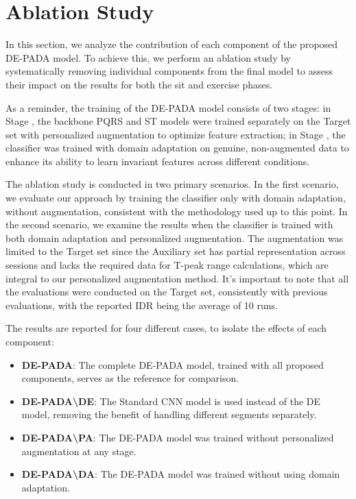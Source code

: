 \section{Ablation Study}
\label{sec:ablation_study}
In this section, we analyze the contribution of each component of the proposed DE-PADA model.
To achieve this, we perform an ablation study by systematically removing individual components from the final model to assess their impact on the results for both the sit and exercise phases.

As a reminder, the training of the DE-PADA model consists of two stages: in Stage \uppercase\expandafter{}, the backbone PQRS and ST models were trained separately on the Target set with personalized augmentation to optimize feature extraction; in Stage \uppercase\expandafter{}, the classifier was trained with domain adaptation on genuine, non-augmented data to enhance its ability to learn invariant features across different conditions.

The ablation study is conducted in two primary scenarios. In the first scenario, we evaluate our approach by training the classifier only with domain adaptation, without augmentation, consistent with the methodology used up to this point.
In the second scenario, we examine the results when the classifier is trained with both domain adaptation and personalized augmentation. The augmentation was limited to the Target set since the Auxiliary set has partial representation across sessions and lacks the required data for T-peak range calculations, which are integral to our personalized augmentation method. It's important to note that all the evaluations were conducted on the Target set, consistently with previous evaluations, with the reported IDR being the average of 10 runs.

The results are reported for four different cases, to isolate the effects of each component:
\begin{itemize}
    \item \textbf{DE-PADA}: The complete DE-PADA model, trained with all proposed components, serves as the reference for comparison.
    \item \textbf{DE-PADA\textbackslash DE}: The Standard CNN model is used instead of the DE model, removing the benefit of handling different segments separately.
    \item \textbf{DE-PADA\textbackslash PA}: The DE-PADA model was trained without personalized augmentation at any stage.
    \item \textbf{DE-PADA\textbackslash DA}: The DE-PADA model was trained without using domain adaptation.
\end{itemize}

